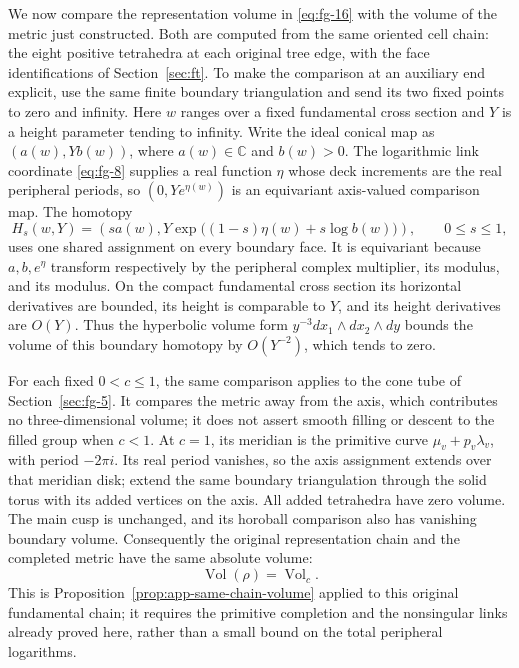 We now compare the representation volume in \eqref{eq:fg-16}
with the volume of the metric just constructed. Both are computed from the same oriented cell chain:
the eight positive tetrahedra at each original tree edge, with the
face identifications of Section~\ref{sec:ft}. To make the comparison
at an auxiliary end explicit, use the same finite boundary
triangulation and send its two fixed points to zero and infinity.
Here \(w\) ranges over a fixed fundamental cross section and
\(Y\) is a height parameter tending to infinity. Write the ideal
conical map as \((a(w),Yb(w))\), where \(a(w)\in\mathbb C\)
and \(b(w)>0\). The logarithmic link coordinate
\eqref{eq:fg-8} supplies a real function \(\eta\) whose deck increments
are the real peripheral periods, so \((0,Ye^{\eta(w)})\) is an
equivariant axis-valued comparison map. The homotopy
\[
 H_s(w,Y)=\left(sa(w),
     Y\exp\bigl((1-s)\eta(w)+s\log b(w)\bigr)\right),
                 \qquad 0\le s\le1,
\]
uses one shared assignment on every boundary face. It is equivariant
because \(a,b,e^\eta\) transform respectively by the peripheral
complex multiplier, its modulus, and its modulus. On the compact
fundamental cross section its horizontal derivatives are bounded,
its height is comparable to \(Y\), and its height derivatives are
\(O(Y)\). Thus the hyperbolic volume form
\(y^{-3}dx_1\wedge dx_2\wedge dy\) bounds the volume of this boundary
homotopy by \(O(Y^{-2})\), which tends to zero.

For each fixed \(0<c\le1\), the same comparison applies to the cone
tube of Section~\ref{sec:fg-5}. It compares the metric away from the
axis, which contributes no three-dimensional volume; it does not
assert smooth filling or descent to the filled group when \(c<1\). At \(c=1\), its meridian is the primitive curve
\(\mu_v+p_v\lambda_v\), with period \(-2\pi i\). Its real period
vanishes, so the axis assignment extends over that meridian disk;
extend the same boundary triangulation through the solid torus
with its added vertices on the axis. All added tetrahedra have zero
volume. The main cusp is unchanged, and its horoball comparison
also has vanishing boundary volume. Consequently the original representation chain and the completed
metric have the same absolute volume:
\begin{equation}
 \operatorname{Vol}(\rho)=\operatorname{Vol}_c.
\label{eq:fg-16a}
\end{equation} This is Proposition~\ref{prop:app-same-chain-volume} applied to this
original fundamental chain; it requires the primitive
completion and the nonsingular links already proved here, rather
than a small bound on the total peripheral logarithms.

